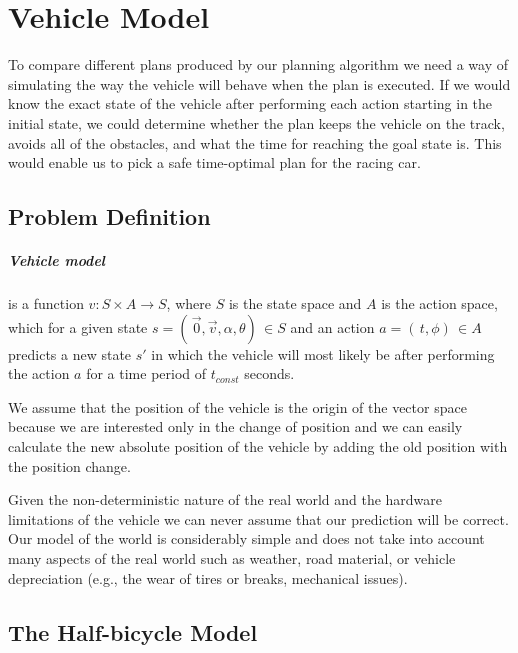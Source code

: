 \chapter{Vehicle Model}

To compare different plans produced by our planning algorithm we need a way of simulating the way the vehicle will behave when the plan is executed. If we would know the exact state of the vehicle after performing each action starting in the initial state, we could determine whether the plan keeps the vehicle on the track, avoids all of the obstacles, and what the time for reaching the goal state is. This would enable us to pick a safe time-optimal plan for the racing car.

\section{Problem Definition}

\paragraph{Vehicle model} is a function $v: S \times A \rightarrow S$, where $S$ is the state space and $A$ is the action space, which for a given state $s = ( \, \vec{0}, \vec{v}, \alpha, \theta ) \, \in S$ and an action $a = ( \, t, \phi ) \, \in A$ predicts a new state $s\prime$ in which the vehicle will most likely be after performing the action $a$ for a time period of $t_{const}$ seconds.

We assume that the position of the vehicle is the origin of the vector space because we are interested only in the change of position and we can easily calculate the new absolute position of the vehicle by adding the old position with the position change.

Given the non-deterministic nature of the real world and the hardware limitations of the vehicle we can never assume that our prediction will be correct. Our model of the world is considerably simple and does not take into account many aspects of the real world such as weather, road material, or vehicle depreciation (e.g., the wear of tires or breaks, mechanical issues). 


\section{The Half-bicycle Model}

